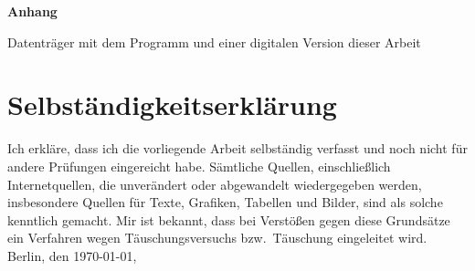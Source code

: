 \documentclass[draft=false,twoside,11pt]{scrreprt}
\begin{document}

\printbibliography
{}

\vfill

\noindent\textbf{\huge{Anhang}} 

\vspace{.8cm}

\noindent Datenträger mit dem Programm und einer digitalen Version dieser Arbeit

\vspace{3cm}

\chapter*{Selbständigkeitserklärung}

Ich erkläre, dass ich die vorliegende Arbeit selbständig verfasst und noch nicht 
für andere Prüfungen eingereicht habe. Sämtliche Quellen, einschließlich
Internetquellen, die unverändert oder abgewandelt wiedergegeben werden,
insbesondere Quellen für Texte, Grafiken, Tabellen und Bilder, sind als solche
kenntlich gemacht. Mir ist bekannt, dass bei Verstößen gegen diese Grundsätze ein
Verfahren wegen Täuschungsversuchs bzw.\ Täuschung eingeleitet wird. 
\bigbreak
\noindent Berlin, den \today, 
\end{document}
